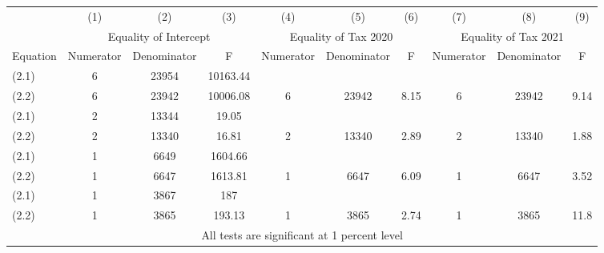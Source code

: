 \begin{tabular}{lccccccccc} \hline
	& (1) & (2) & (3) & (4) & (5) & (6)  & (7) & (8) & (9) \\
	&\multicolumn{3}{c}{Equality of Intercept} &\multicolumn{3}{c}{Equality of Tax 2020} &\multicolumn{3}{c}{Equality of Tax 2021}\\
Equation&Numerator&Denominator&F&Numerator&Denominator&F&Numerator&Denominator&F \\
(2.1)&6&23954&10163.44\\
(2.2)&6&23942&10006.08&6&23942&8.15&6&23942&9.14\\
(2.1)&2&13344&19.05\\
(2.2)&2&13340&16.81&2&13340&2.89&2&13340&1.88\\
(2.1)&1&6649&1604.66\\
(2.2)&1&6647&1613.81&1&6647&6.09&1&6647&3.52\\
(2.1)&1&3867&187\\
(2.2)&1&3865&193.13&1&3865&2.74&1&3865&11.8\\
 \hline
 \multicolumn{10}{c}{ All tests are significant at 1 percent level} \\


\end{tabular}